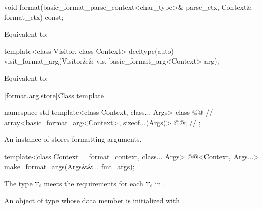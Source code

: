 %
\begin{itemdecl}
void format(basic_format_parse_context<char_type>& parse_ctx, Context& format_ctx) const;
\end{itemdecl}

\begin{itemdescr}
\pnum
\effects
Equivalent to: 
\end{itemdescr}

%
\begin{itemdecl}
template<class Visitor, class Context>
  decltype(auto) visit_format_arg(Visitor&& vis, basic_format_arg<Context> arg);
\end{itemdecl}

\begin{itemdescr}
\pnum
\effects
Equivalent to: 
\end{itemdescr}

[format.arg.store]{Class template }

\begin{codeblock}
namespace std {
  template<class Context, class... Args>
  class @@ {                                      // \expos
    array<basic_format_arg<Context>, sizeof...(Args)> @@;     // \expos
  };
}
\end{codeblock}

\pnum
An instance of  stores formatting arguments.

%
\begin{itemdecl}
template<class Context = format_context, class... Args>
  @@<Context, Args...> make_format_args(Args&&... fmt_args);
\end{itemdecl}

\begin{itemdescr}
\pnum
\expects
The type
$\texttt{T}_i$\tcode{>>}\linebreak{}
meets the  requirements
for each $\texttt{T}_i$ in .

\pnum
\returns
An object of type 
whose  data member is initialized with
.
\end{itemdescr}

